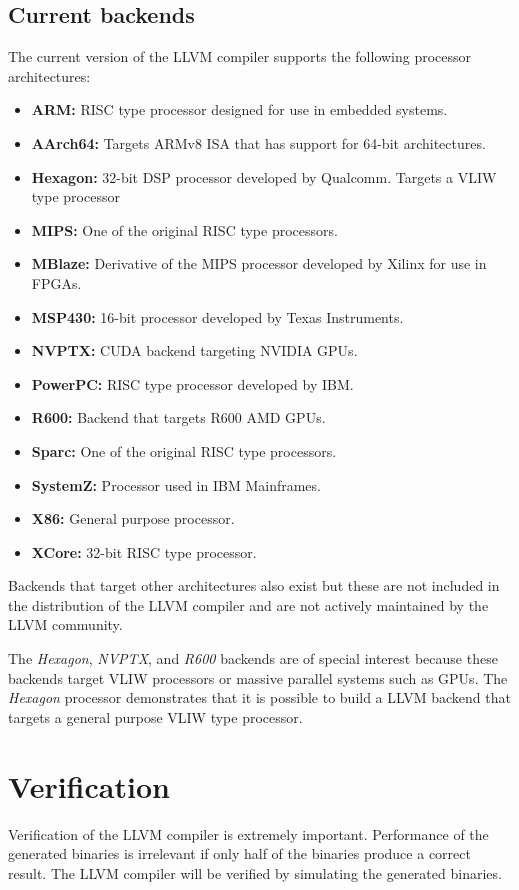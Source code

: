 \subsection{Current backends}
The current version of the LLVM compiler supports the following processor architectures:

\begin{itemize}
  \item \textbf{ARM:} RISC type processor designed for use in embedded systems.
  \item \textbf{AArch64:} Targets ARMv8 ISA that has support for 64-bit architectures.
  \item \textbf{Hexagon:} 32-bit DSP processor developed by Qualcomm. Targets a VLIW type processor
  \item \textbf{MIPS:} One of the original RISC type processors.  
  \item \textbf{MBlaze:} Derivative of the MIPS processor developed by Xilinx for use in FPGAs.
  \item \textbf{MSP430:} 16-bit processor developed by Texas Instruments.
  \item \textbf{NVPTX:} CUDA backend targeting NVIDIA GPUs.
  \item \textbf{PowerPC:} RISC type processor developed by IBM.
  \item \textbf{R600:} Backend that targets R600 AMD GPUs.
  \item \textbf{Sparc:} One of the original RISC type processors.
  \item \textbf{SystemZ:} Processor used in IBM Mainframes.
  \item \textbf{X86:} General purpose processor.
  \item \textbf{XCore:} 32-bit RISC type processor.
\end{itemize}

Backends that target other architectures also exist but these are not included in the distribution of the LLVM compiler and are not actively maintained by the LLVM community.

The \emph{Hexagon}, \emph{NVPTX}, and \emph{R600} backends are of special interest because these backends target VLIW processors or massive parallel systems such as GPUs. The \emph{Hexagon} processor demonstrates that it is possible to build a LLVM backend that targets a general purpose VLIW type processor.

\section{Verification}
Verification of the LLVM compiler is extremely important. Performance of the generated binaries is irrelevant if only half of the binaries produce a correct result. The LLVM compiler will be verified by simulating the generated binaries. 

